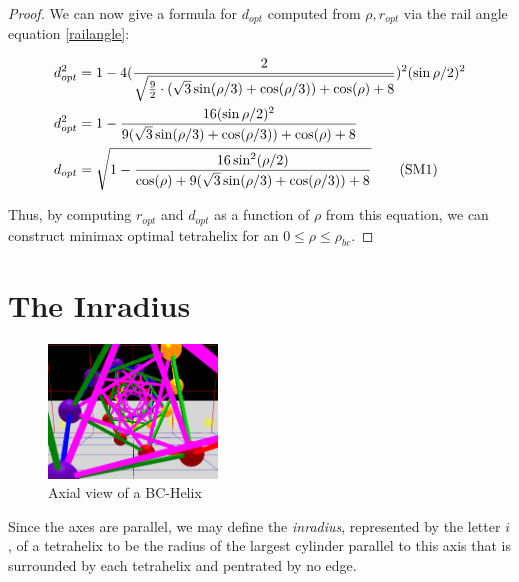 \documentclass[review]{siamonline1116}
\newcommand\numberthis{\addtocounter{equation}{1}\tag{\theequation}}
\begin{document}
\begin{proof}
We can now give a formula for $ d_{opt} $ computed from $\rho, r_{opt}$ via the rail angle equation \eqref{railangle}:

\begin{align*}
  d_{opt}^2 &= 1 - 4 (\frac{2}{\sqrt{\frac{9}{2} \cdot ( \sqrt{3} \sin(\rho/3) + \cos(\rho/3)) + \cos(\rho)+ 8 }})^2 (\sin{ \rho / 2})^2   \\
  d_{opt}^2 &= 1 - \frac{16(\sin{ \rho / 2})^2}{9 ( \sqrt{3} \sin(\rho/3) + \cos(\rho/3)) + \cos(\rho)+ 8 }    \\
    d_{opt} &= \sqrt{1 - \frac{16 \sin^2(\rho / 2) }{ \cos(\rho) + 9( \sqrt{3} \sin(\rho/3) + \cos(\rho/3)) + 8 }}    \numberthis  \label{dopt}  \\      
\end{align*}

Thus, by computing $r_{opt}$  and $d_{opt}$ as a function of $\rho$ from this equation, we can construct minimax optimal tetrahelix for an $0 \leq \rho \leq \rho_{bc}$.
\end{proof}

\section{The Inradius}

\begin{figure}[H]
     \centering
     \includegraphics[width=0.4\textwidth]{figures/AxialView.png}
     \caption{Axial view of a BC-Helix}
  \label{axialview}     
\end{figure}

Since the axes are parallel, we may define the \emph{inradius}, represented by the letter $i$, of a
tetrahelix to be the radius of the largest
cylinder parallel to this axis that is surrounded by each tetrahelix and pentrated by no edge.
\end{document}
